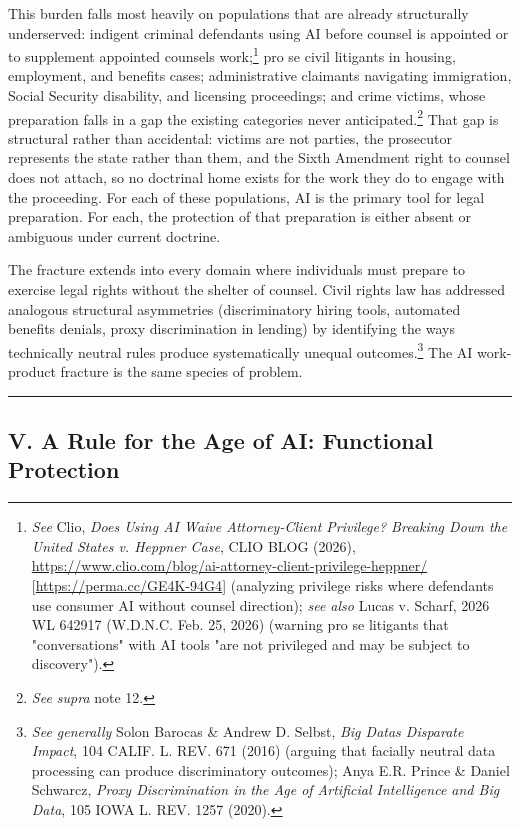 \documentclass[
  12pt,
]{article}
\begin{document}
This burden falls most heavily on populations that are already
structurally underserved: indigent criminal defendants using AI before
counsel is appointed or to supplement appointed
counsel\textquotesingle s work;\footnote{\emph{See} Clio, \emph{Does
  Using AI Waive Attorney-Client Privilege? Breaking Down the United
  States v. Heppner Case}, CLIO BLOG (2026),
  \url{https://www.clio.com/blog/ai-attorney-client-privilege-heppner/}
  {[}\url{https://perma.cc/GE4K-94G4}{]} (analyzing privilege risks
  where defendants use consumer AI without counsel direction); \emph{see
  also} Lucas v. Scharf, 2026 WL 642917 (W.D.N.C. Feb. 25, 2026)
  (warning pro se litigants that "conversations" with AI tools "are not
  privileged and may be subject to discovery").} pro se civil litigants
in housing, employment, and benefits cases; administrative claimants
navigating immigration, Social Security disability, and licensing
proceedings; and crime victims, whose preparation falls in a gap the
existing categories never anticipated.\footnote{\emph{See supra} note
  12.} That gap is structural rather than accidental: victims are not
parties, the prosecutor represents the state rather than them, and the
Sixth Amendment right to counsel does not attach, so no doctrinal home
exists for the work they do to engage with the proceeding. For each of
these populations, AI is the primary tool for legal preparation. For
each, the protection of that preparation is either absent or ambiguous
under current doctrine.

The fracture extends into every domain where individuals must prepare to
exercise legal rights without the shelter of counsel. Civil rights law
has addressed analogous structural asymmetries (discriminatory hiring
tools, automated benefits denials, proxy discrimination in lending) by
identifying the ways technically neutral rules produce systematically
unequal outcomes.\footnote{\emph{See generally} Solon Barocas \& Andrew
  D. Selbst, \emph{Big Data\textquotesingle s Disparate Impact}, 104
  CALIF. L. REV. 671 (2016) (arguing that facially neutral data
  processing can produce discriminatory outcomes); Anya E.R. Prince \&
  Daniel Schwarcz, \emph{Proxy Discrimination in the Age of Artificial
  Intelligence and Big Data}, 105 IOWA L. REV. 1257 (2020).} The AI
work-product fracture is the same species of problem.

\begin{center}\rule{0.5\linewidth}{0.5pt}\end{center}

\subsection{V. A Rule for the Age of AI: Functional
Protection}\label{v-a-rule-for-the-age-of-ai-functional-protection}
\end{document}
